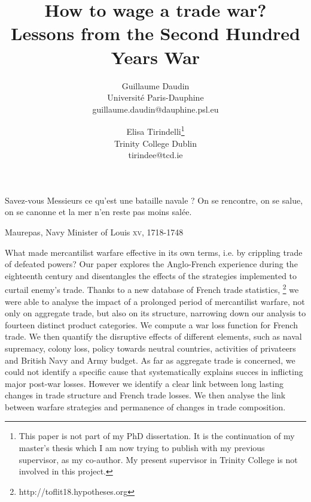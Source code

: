 \documentclass[12pt,a4paper,notitlepage]{article}
\begin{document}
\title{How to wage a trade war? \\
Lessons from the Second Hundred Years War}
\author{
  Guillaume Daudin \\ Université Paris-Dauphine \\guillaume.daudin@dauphine.psl.eu		
  \and
  Elisa Tirindelli\footnote{This paper is not part of my PhD dissertation. It is the continuation of my master's thesis which I am now trying to publish with my previous supervisor, as my co-author. My present supervisor in Trinity College is not involved in this project.} \\ Trinity College Dublin  \\ tirindee@tcd.ie
}
\date{}
\maketitle


\epigraph{Savez-vous Messieurs ce qu’est une bataille navale ? On se rencontre, on se salue, on se canonne et la mer n’en reste pas moins salée.}{Maurepas, Navy Minister of Louis  \textsc{xv}, 1718-1748}

What made mercantilist warfare effective in its own terms, i.e. by crippling trade of defeated powers?
Our paper explores the Anglo-French experience during the eighteenth century and disentangles the effects of the strategies implemented to curtail enemy's trade.
Thanks to a new database of French trade statistics, \footnote{http://toflit18.hypotheses.org} we were able to analyse the impact of a prolonged period of mercantilist warfare, not only on aggregate trade, but also on its structure, narrowing down our analysis to fourteen distinct product categories.
We compute a war loss function for French trade.
We then quantify the disruptive effects of different elements, such as naval supremacy, colony loss, policy towards neutral countries, activities of privateers and British Navy and Army budget.
As far as aggregate trade is concerned, we could not identify a specific cause that systematically explains succes in inflicting major post-war losses.
However we identify a clear link between long lasting changes in trade structure and French trade losses.
We then analyse the link between warfare strategies and permanence of changes in trade composition.\\
\end{document}
